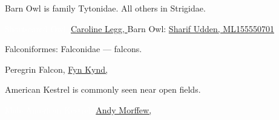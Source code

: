 \documentclass[t]{beamer}
\begin{document}
{

\begin{frame}{Barn Owl is family Tytonidae. All others in Strigidae.}



\vfilll

\tiny \textcolor{white}{Short-eared Owl: \href{https://flickr.com/photos/128941223@N02/49978078296}{Caroline Legg, }} \hfill Barn Owl: \href{https://macaulaylibrary.org/asset/155550701}{Sharif Udden, ML155550701}
\end{frame}
}

{
\begin{frame}{Falconiformes: Falconidae — falcons.}


\tinyfill Peregrin Falcon, \href{https://flickr.com/photos/79452129@N02/21571335442}{Fyn Kynd, }
\end{frame}
}

{
\begin{frame}{American Kestrel is commonly seen near open fields.}



\tinyfill \textcolor{white}{Male American Kestrel, %
 \href{https://commons.wikimedia.org/wiki/File:American_Kestrel_(Male)_(8238822396).jpg}{Andy Morffew, }}
\end{frame}
}
\end{document}
